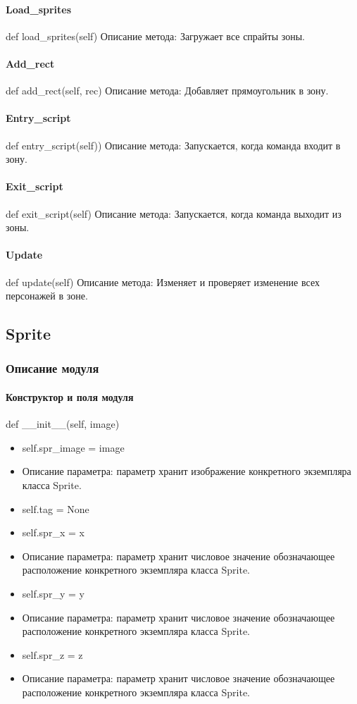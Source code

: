 \paragraph{Load\_sprites}
def load\_sprites(self)
Описание метода: Загружает все спрайты зоны.
\paragraph{Add\_rect}
def add\_rect(self, rec)
Описание метода: Добавляет прямоугольник в зону.
\paragraph{Entry\_script}
def entry\_script(self))
Описание метода: Запускается, когда команда входит в зону.
\paragraph{Exit\_script}
def exit\_script(self)
Описание метода: Запускается, когда команда выходит из зоны.
\paragraph{Update}
def update(self)
Описание метода: Изменяет и проверяет изменение всех персонажей в зоне.

\subsection{Sprite}
\subsubsection{Описание модуля}
\paragraph{Конструктор и поля модуля}
def \_\_init\_\_(self, image)
\begin{itemize}
	\item self.spr\_image = image
	\item Описание параметра: параметр хранит изображение конкретного экземпляра класса Sprite.
	\item self.tag = None
	\item self.spr\_x = x
	\item Описание параметра: параметр хранит числовое значение обозначающее расположение конкретного экземпляра класса Sprite.
	\item self.spr\_y = y
	\item Описание параметра: параметр хранит числовое значение обозначающее расположение конкретного экземпляра класса Sprite.
	\item self.spr\_z = z
	\item Описание параметра: параметр хранит числовое значение обозначающее расположение конкретного экземпляра класса Sprite.
\end{itemize}

